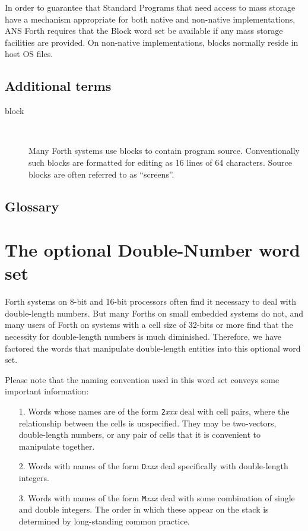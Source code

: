 In order to guarantee that Standard Programs that need access to mass
storage have a mechanism appropriate for both native and non-native
implementations, ANS Forth requires that the Block word set be
available if any mass storage facilities are provided. On non-native
implementations, blocks normally reside in host OS files.

\setcounter{subsection}{1}
\subsection{Additional terms} %

\begin{description}
\item[block] ~

	Many Forth systems use blocks to contain program source.
	Conventionally such blocks are formatted for editing as
	16 lines of 64 characters. Source blocks are often referred
	to as ``screens''.
\end{description}

\setcounter{subsection}{5}
\subsection{Glossary} %



\section{The optional Double-Number word set} %
\label{rat:double}

Forth systems on 8-bit and 16-bit processors often find it necessary
to deal with double-length numbers. But many Forths on small embedded
systems do not, and many users of Forth on systems with a cell size of
32-bits or more find that the necessity for double-length numbers is
much diminished. Therefore, we have factored the words that manipulate
double-length entities into this optional word set.

Please note that the naming convention used in this word set conveys
some important information:

\begin{enumerate}
\item[1.]
	Words whose names are of the form \texttt{2}\emph{xxx} deal
	with cell pairs, where the relationship between the cells is
	unspecified. They may be two-vectors, double-length numbers, or
	any pair of cells that it is convenient to manipulate together.

\item[2.]
	Words with names of the form \texttt{D}\emph{xxx} deal
	specifically with double-length integers.

\item[3.]
	Words with names of the form \texttt{M}\emph{xxx} deal with
	some combination of single and double integers. The order in
	which these appear on the stack is determined by long-standing
	common practice.
\end{enumerate}

